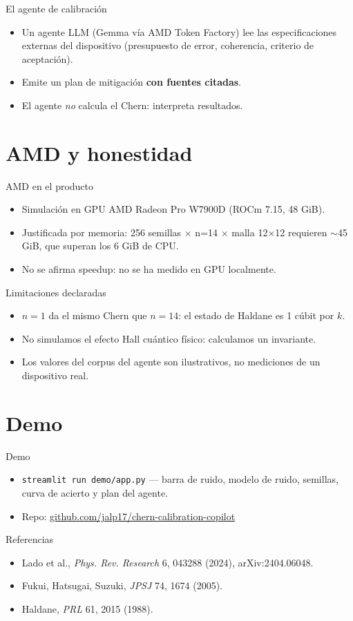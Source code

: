 \documentclass[10pt,aspectratio=169]{beamer}
\begin{document}
\begin{frame}{El agente de calibración}
\begin{itemize}
\item Un agente LLM (Gemma vía AMD Token Factory) lee las especificaciones externas del dispositivo (presupuesto de error, coherencia, criterio de aceptación).
\item Emite un plan de mitigación \textbf{con fuentes citadas}.
\item El agente \emph{no} calcula el Chern: interpreta resultados.
\end{itemize}
\end{frame}

\section{AMD y honestidad}
\begin{frame}{AMD en el producto}
\begin{itemize}
\item Simulación en GPU AMD Radeon Pro W7900D (ROCm 7.15, 48 GiB).
\item Justificada por memoria: 256 semillas $\times$ n=14 $\times$ malla 12$\times$12 requieren $\sim$45 GiB, que superan los 6 GiB de CPU.
\item No se afirma speedup: no se ha medido en GPU localmente.
\end{itemize}
\end{frame}

\begin{frame}{Limitaciones declaradas}
\begin{itemize}
\item $n=1$ da el mismo Chern que $n=14$: el estado de Haldane es 1 cúbit por $k$.
\item No simulamos el efecto Hall cuántico físico: calculamos un invariante.
\item Los valores del corpus del agente son ilustrativos, no mediciones de un dispositivo real.
\end{itemize}
\end{frame}

\section{Demo}
\begin{frame}{Demo}
\begin{itemize}
\item \texttt{streamlit run demo/app.py} — barra de ruido, modelo de ruido, semillas, curva de acierto y plan del agente.
\item Repo: \url{github.com/jalp17/chern-calibration-copilot}
\end{itemize}
\end{frame}

\begin{frame}{Referencias}
\begin{itemize}
\item Lado et al., \emph{Phys. Rev. Research} 6, 043288 (2024), arXiv:2404.06048.
\item Fukui, Hatsugai, Suzuki, \emph{JPSJ} 74, 1674 (2005).
\item Haldane, \emph{PRL} 61, 2015 (1988).
\end{itemize}
\end{frame}
\end{document}

